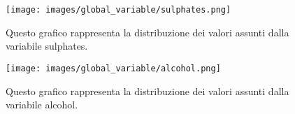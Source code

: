 \begin{figure}[H]
    \centering
    \texttt{[image: images/global\_variable/sulphates.png]}
    \caption{Questo grafico rappresenta la distribuzione dei valori assunti dalla variabile sulphates.}
    \label{fig:global_sulphates}
\end{figure}

\begin{figure}[H]
    \centering
    \texttt{[image: images/global\_variable/alcohol.png]}
    \caption{Questo grafico rappresenta la distribuzione dei valori assunti dalla variabile alcohol.}
    \label{fig:global_alcohol}
\end{figure}

